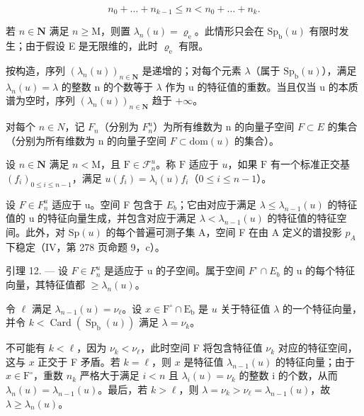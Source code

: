 \[
n _ {0} + \dots + n _ {k - 1} \leqslant n <   n _ {0} + \dots + n _ {k}.
\]

若 \(n \in \mathbf{N}\) 满足 \(n \geqslant \mathrm{M}\)，则置 \(\lambda_n(u) = \varrho_{\mathrm{e}}\)。此情形只会在 \(\mathrm{Sp}_{\mathrm{b}}(u)\) 有限时发生；由于假设 E 是无限维的，此时 \(\varrho_{\mathrm{e}}\) 有限。

按构造，序列 \((\lambda_{n}(u))_{n\in\mathbf{N}}\) 是递增的；对每个元素 \(\lambda\)（属于 \(\mathrm{Sp}_{\mathrm{b}}(u)\)），满足 \(\lambda_{n}(u)=\lambda\) 的整数 n 的个数等于 \(\lambda\) 作为 u 的特征值的重数。当且仅当 u 的本质谱为空时，序列 \((\lambda_{n}(u))_{n\in\mathbf{N}}\) 趋于 \(+\infty\)。

对每个 \(n \in N\)，记 \(F_{n}\)（分别为 \(F_{n}^{u}\)）为所有维数为 n 的向量子空间 \(F \subset E\) 的集合（分别为所有维数为 n 的向量子空间 \(F \subset \text{dom}(u)\) 的集合）。

设 \(n \in \mathbf{N}\) 满足 \(n < \mathrm{M}\)，且 \(\mathrm{F} \in \mathcal{F}_n^u\)。称 \(\mathrm{F}\) 适应于 \(u\)，如果 \(\mathrm{F}\) 有一个标准正交基 \((f_i)_{0 \leqslant i \leqslant n-1}\)，满足 \(u(f_i) = \lambda_i(u)f_i\)（\(0 \leqslant i \leqslant n-1\)）。

设 \(F \in F_{n}^{u}\) 适应于 u。空间 F 包含于 \(E_{b}\)；它由对应于满足 \(\lambda \leqslant \lambda_{n-1}(u)\) 的特征值的 u 的特征向量生成，并包含对应于满足 \(\lambda < \lambda_{n-1}(u)\) 的特征值的特征空间。此外，对 \(\mathrm{Sp}(u)\) 的每个普遍可测子集 A，空间 F 在由 A 定义的谱投影 \(p_{A}\) 下稳定（IV，第 278 页命题 9，c）。

引理 12. --- 设 \(F \in F_{n}^{u}\) 是适应于 u 的子空间。属于空间 \(F^{\circ} \cap E_{b}\) 的 u 的每个特征向量，其特征值都 \(\geqslant \lambda_{n}(u)\)。

令 \(\ell\) 满足 \(\lambda_{n-1}(u) = \nu_{\ell}\)。设 \(x \in \mathrm{F}^{\circ} \cap \mathrm{E}_{\mathrm{b}}\) 是 \(u\) 关于特征值 \(\lambda\) 的一个特征向量，并令 \(k < \operatorname{Card}(\operatorname{Sp}_{\mathrm{b}}(u))\) 满足 \(\lambda = \nu_{k}\)。

不可能有 \(k < \ell\)，因为 \(\nu_k < \nu_\ell\)，此时空间 F 将包含特征值 \(\nu_k\) 对应的特征空间，这与 \(x\) 正交于 F 矛盾。若 \(k = \ell\)，则 \(x\) 是特征值 \(\lambda_{n-1}(u)\) 的特征向量；由于 \(x \in \mathrm{F}^\circ\)，重数 \(n_k\) 严格大于满足 \(i < n\) 且 \(\lambda_i(u) = \nu_k\) 的整数 i 的个数，从而 \(\lambda_n(u) = \lambda_{n-1}(u)\)。最后，若 \(k > \ell\)，则 \(\lambda = \nu_k > \nu_\ell = \lambda_{n-1}(u)\)，故 \(\lambda \geqslant \lambda_n(u)\)。

